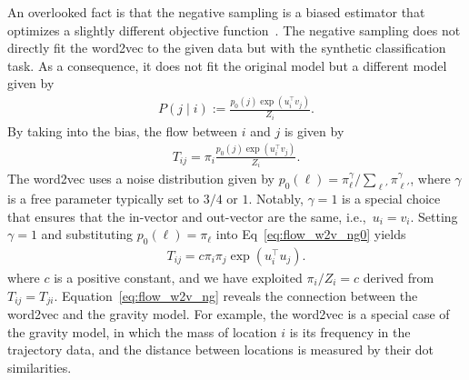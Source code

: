 \documentclass[12pt]{article} %
\def\given{\mid}
\def\ie{i.e.,~}
\begin{document}
An overlooked fact is that the negative sampling is a biased estimator that optimizes a slightly different objective function~\cite{Gutmann2010}.
The negative sampling does not directly fit the word2vec to the given data but with the synthetic classification task.
As a consequence, it does not fit the original model but a different model given by \cite{Gutmann2010}
\begin{align}
    P\left(j \given i \right):= \frac{p_0(j)\exp(u^\top _i v_j)}{Z_i}.
\end{align}
By taking into the bias, the flow between $i$ and $j$ is given by
\begin{align}
    T_{ij}=\pi_i\frac{p_0(j)\exp(u_i ^\top v_j)}{Z_i}. \label{eq:flow_w2v_ng0}
\end{align}
The word2vec uses a noise distribution given by $p_{0}(\ell) = \pi^{\gamma} _\ell / \sum_{\ell'} \pi^{\gamma}_{\ell'}$, where $\gamma$ is a free parameter typically set to $3/4$ or $1$.
Notably, $\gamma=1$ is a special choice that ensures that the in-vector and out-vector are the same, \ie $u_i = v_i$.
Setting $\gamma = 1$ and substituting $p_0 (\ell) = \pi_\ell$ into Eq~\eqref{eq:flow_w2v_ng0} yields
\begin{align}
    T_{ij}=c\pi_i \pi_j\exp(u_i ^\top u_j). \label{eq:flow_w2v_ng}
\end{align}
where $c$ is a positive constant, and we have exploited $\pi_i/Z_i = c$ derived from $T_{ij} = T_{ji}$.
Equation~\eqref{eq:flow_w2v_ng} reveals the connection between the word2vec and the gravity model.
For example, the word2vec is a special case of the gravity model, in which the mass of location $i$ is its frequency in the trajectory data, and the distance between locations is measured by their dot similarities.
\end{document}
